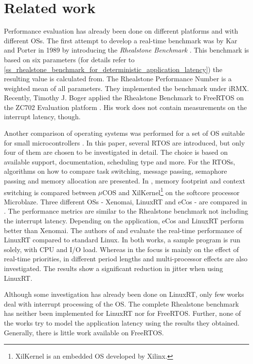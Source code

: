 \section{Related work}
Performance evaluation has already been done on different platforms and with different \acp{OS}. 
The first attempt to develop a real-time benchmark was by Kar and Porter in 1989 by introducing the \textit{Rhealstone Benchmark} \cite{kar:itrb} \cite{kar:artbp}. 
This benchmark is based on six parameters (for details refer to \ref{ss_rhealstone_benchmark_for_deterministic_application_latency}) the resulting value is calculated from.
The Rhealstone Performance Number is a weighted mean of all parameters. 
They implemented the benchmark under iRMX.
Recently, Timothy J. Boger applied the Rhealstone Benchmark to FreeRTOS on the ZC702 Evaluation platform \cite{boger:rbofatxzepp}.
His work does not contain measurements on the interrupt latency, though.
\par
Another comparison of operating systems was performed for a set of \ac{OS} suitable for small microcontrollers \cite{Anh:sapeortosfsm}. 
In this paper, several \ac{RTOS} are introduced, but only four of them are chosen to be investigated in detail.
The choice is based on available support, documentation, scheduling type and more. 
For the \acp{RTOS}, algorithms on how to compare task switching, message passing, semaphore passing and memory allocation are presented.  
In \cite{gokhan:cstamfcoxamom}, memory footprint and context switching is compared between $\mu$COS and XilKernel\footnote{XilKernel \cite{xilinx:xilkernel} is an embedded \ac{OS} developed by Xilinx.} on the softcore processor Microblaze.
Three different \acp{OS} - Xenomai, LinuxRT and eCos \cite{ecos} - are compared in \cite{Marieska:opokbaertosbaa}.
The performance metrics are similar to the Rhealstone benchmark not including the interrupt latency.
Depending on the application, eCos and LinuxRT perform better than Xenomai.
The authors of \cite{cereia:peoaemulatrp} and \cite{betz:eeotlrpfrta} evaluate the real-time performance of LinuxRT compared to standard Linux.
In both works, a sample program is run solely, with CPU and I/O load. 
Whereas in \cite{cereia:peoaemulatrp} the focus is mainly on the effect of real-time priorities, in \cite{betz:eeotlrpfrta} different period lengths and multi-processor effects are also investigated. 
The results show a significant reduction in jitter when using LinuxRT.
\par
Although some investigation has already been done on LinuxRT, only few works deal with interrupt processing of the \ac{OS}.
The complete Rhealstone benchmark has neither been implemented for LinuxRT nor for FreeRTOS.
Further, none of the works try to model the application latency using the results they obtained.
Generally, there is little work available on FreeRTOS.

